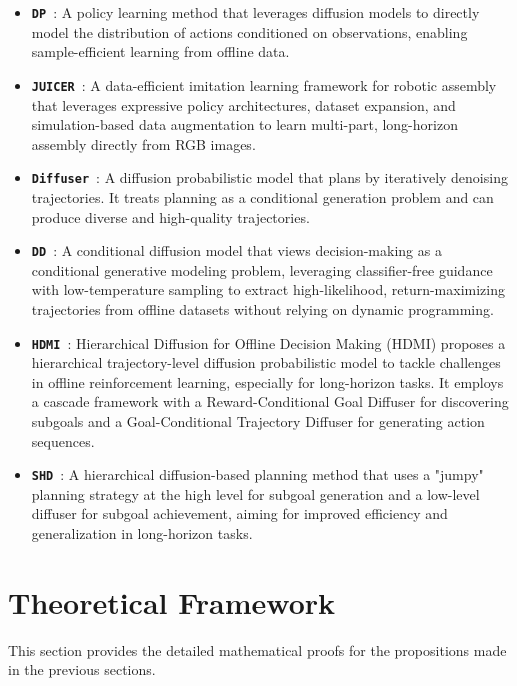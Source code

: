 \documentclass{article} %
\begin{document}
\begin{itemize}
    \item \texttt{\textbf{DP}}~\citep{chi2023diffusion}: A policy learning method that leverages diffusion models to directly model the distribution of actions conditioned on observations, enabling sample-efficient learning from offline data.
    \item \texttt{\textbf{JUICER}}~\citep{ankile2024juicer}: A data-efficient imitation learning framework for robotic assembly that leverages expressive policy architectures, dataset expansion, and simulation-based data augmentation to learn multi-part, long-horizon assembly directly from RGB images.
    \item \texttt{\textbf{Diffuser}}~\citep{janner2022planning}: A diffusion probabilistic model that plans by iteratively denoising trajectories. It treats planning as a conditional generation problem and can produce diverse and high-quality trajectories.
    \item \texttt{\textbf{DD}}~\citep{ajayconditional}: A conditional diffusion model that views decision-making as a conditional generative modeling problem, leveraging classifier-free guidance with low-temperature sampling to extract high-likelihood, return-maximizing trajectories from offline datasets without relying on dynamic programming.
    \item \texttt{\textbf{HDMI}}~\citep{li2023hierarchical}: Hierarchical Diffusion for Offline Decision Making (HDMI) proposes a hierarchical trajectory-level diffusion probabilistic model to tackle challenges in offline reinforcement learning, especially for long-horizon tasks. It employs a cascade framework with a Reward-Conditional Goal Diffuser for discovering subgoals and a Goal-Conditional Trajectory Diffuser for generating action sequences.
    \item \texttt{\textbf{SHD}}~\citep{chensimple}: A hierarchical diffusion-based planning method that uses a "jumpy" planning strategy at the high level for subgoal generation and a low-level diffuser for subgoal achievement, aiming for improved efficiency and generalization in long-horizon tasks.
\end{itemize}


\newpage
\section{Theoretical Framework}
\label{sec:appendix_proofs}

This section provides the detailed mathematical proofs for the propositions made in the previous sections.
\end{document}
